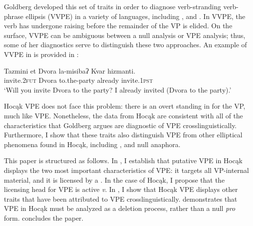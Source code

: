 \documentclass[output=paper]{LSP/langsci}
\begin{document}
Goldberg developed this set of traits in order to diagnose verb-stranding verb-phrase ellipsis (VVPE) in a variety of languages, including ,  and . In VVPE, the verb has undergone raising before the remainder of the VP is elided. On the surface, VVPE can be ambiguous between a null  analysis or VPE analysis; thus, some of her diagnostics serve to distinguish these two approaches. An example of VVPE in  is provided in :

\let\eachwordtwo=\upshape

\ea\label{ex:johnson:2}
\gll Tazmini {et Dvora} la-misibaʔ Kvar hizmanti.\\
invite.\textsc{2fut} Dvora to.the-party already invite.\textsc{1pst}\\
\trans `Will you invite Dvora to the party? I already invited (Dvora to the party).' \\\citep[14]{Goldberg2005}
\z 

 
Hocąk VPE does not face this problem: there is an overt  standing in for the VP, much like  VPE. Nonetheless, the data from Hocąk are consistent with all of the characteristics that Goldberg argues are diagnostic of VPE crosslinguistically. Furthermore, I show that these traits also distinguish VPE from other elliptical phenomena found in Hocąk, including ,  and null  anaphora. 

This paper is structured as follows. In , I establish that putative VPE in Hocąk displays the two most important characteristics of VPE: it targets all VP-internal material, and it is licensed by a . In the case of Hocąk, I propose that the licensing head for VPE is active \emph{v}. In , I show that Hocąk VPE displays other traits that have been attributed to VPE crosslinguistically.  demonstrates that VPE in Hocąk must be analyzed as a deletion process, rather than a null \emph{pro} form.  concludes the paper.
 
\end{document}
